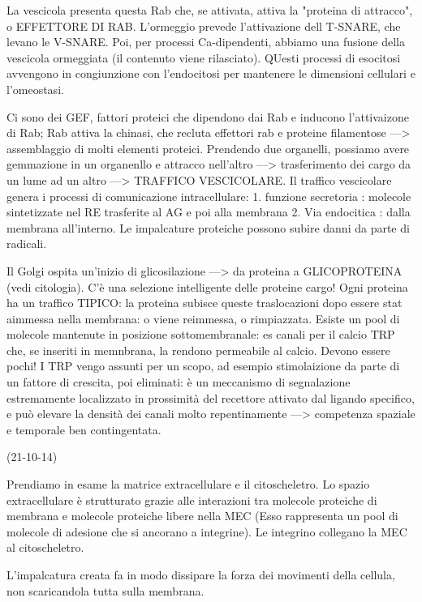 \documentclass[a4paper,12pt]{article}
\begin{document}
La vescicola presenta questa Rab che, se attivata, attiva la "proteina di attracco", o EFFETTORE DI RAB. L'ormeggio prevede l'attivazione dell T-SNARE, che levano le V-SNARE. Poi, per processi Ca-dipendenti, abbiamo una fusione della vescicola ormeggiata (il contenuto viene rilasciato).
QUesti processi di esocitosi avvengono in congiunzione con l'endocitosi per mantenere le dimensioni cellulari e l'omeostasi.

Ci sono dei GEF, fattori proteici che dipendono dai Rab e inducono l'attivaizone di Rab; Rab attiva la chinasi, che recluta effettori rab e proteine filamentose ---> assemblaggio di molti elementi proteici.
Prendendo due organelli, possiamo avere gemmazione in un organenllo e attracco nell'altro ---> trasferimento dei cargo da un lume ad un altro ---> TRAFFICO VESCICOLARE.
Il traffico vescicolare genera i processi di comunicazione intracellulare:
1. funzione secretoria : molecole sintetizzate nel RE trasferite al AG e poi alla membrana
2. Via endocitica : dalla membrana all'interno. Le impalcature proteiche possono subire danni da parte di radicali.

Il Golgi ospita un'inizio di glicosilazione ---> da proteina a GLICOPROTEINA (vedi citologia). C'è una selezione intelligente delle proteine cargo!
Ogni proteina ha un traffico TIPICO: la proteina subisce queste traslocazioni dopo essere stat aimmessa nella membrana: o viene reimmessa, o rimpiazzata. 
Esiste un pool di molecole mantenute in posizione sottomembranale: es canali per il calcio TRP che, se inseriti in memnbrana, la rendono permeabile al calcio. Devono essere pochi! I TRP vengo assunti per un scopo, ad esempio stimolaizione da parte di un fattore di crescita, poi eliminati: è un meccanismo di segnalazione estremamente localizzato in prossimità del recettore attivato dal ligando specifico, e può elevare la densità dei canali molto repentinamente ---> competenza spaziale e temporale ben contingentata. 

(21-10-14)

Prendiamo in esame la matrice extracellulare e il citoscheletro.
Lo spazio extracellulare è strutturato grazie alle interazioni tra molecole proteiche di membrana e molecole proteiche libere nella MEC (Esso rappresenta un pool di molecole di adesione che si ancorano a integrine).
Le integrino collegano la MEC al citoscheletro.

L'impalcatura creata fa in modo dissipare la forza dei movimenti della cellula, non scaricandola tutta sulla membrana.
\end{document}
